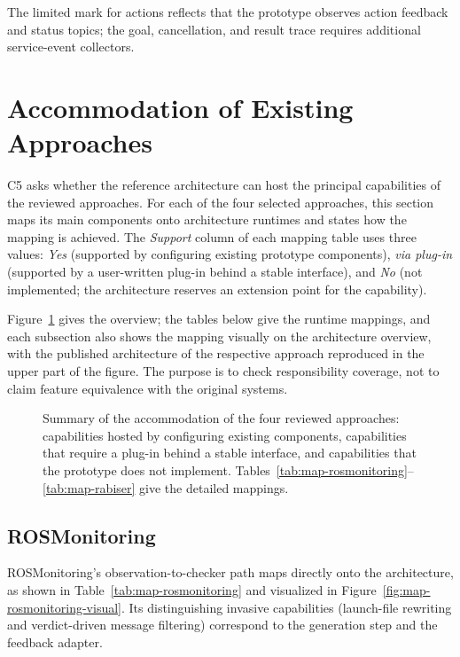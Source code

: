 The limited mark for actions reflects that the prototype observes action
feedback and status topics; the goal, cancellation, and result trace requires
additional service-event collectors.

\section{Accommodation of Existing Approaches}\label{sec:accommodation}

C5 asks whether the reference architecture can host the principal capabilities
of the reviewed approaches. For each of the four selected approaches, this
section maps its main components onto architecture runtimes and states how the
mapping is achieved. The \emph{Support} column of each mapping table uses
three values: \emph{Yes} (supported by configuring existing prototype
components), \emph{via plug-in} (supported by a user-written plug-in behind a
stable interface), and \emph{No} (not implemented; the architecture reserves
an extension point for the capability).

Figure~\ref{fig:compatibility-map} gives the overview; the tables below give
the runtime mappings, and each subsection also shows the mapping visually on
the architecture overview, with the published architecture of the respective
approach reproduced in the upper part of the figure. The purpose is to check
responsibility coverage, not to claim feature equivalence with the original
systems.

\begin{figure}[htbp]
  \centering
  \resizebox{\textwidth}{!}{}
  \caption{Summary of the accommodation of the four reviewed approaches:
  capabilities hosted by configuring existing components, capabilities that
  require a plug-in behind a stable interface, and capabilities that the
  prototype does not implement.
  Tables~\ref{tab:map-rosmonitoring}--\ref{tab:map-rabiser} give the
  detailed mappings.}
  \label{fig:compatibility-map}
\end{figure}

\subsection{ROSMonitoring}

ROSMonitoring's observation-to-checker path maps directly onto the
architecture, as shown in Table~\ref{tab:map-rosmonitoring} and visualized in
Figure~\ref{fig:map-rosmonitoring-visual}. Its
distinguishing invasive capabilities (launch-file rewriting and
verdict-driven message filtering) correspond to the generation step and the
feedback adapter.

